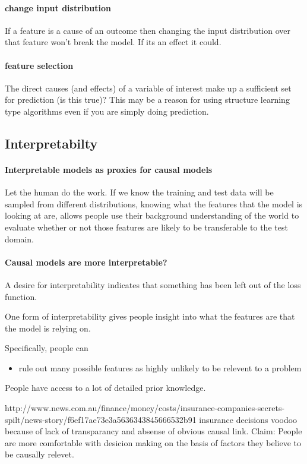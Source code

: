 \documentclass[11pt,a4paper,oneside]{book}
\begin{document}
\paragraph{change input distribution}If a feature is a cause of an outcome then changing the input distribution over that feature won't break the model. If its an effect it could.

\paragraph{feature selection} The direct causes (and effects) of a variable of interest make up a sufficient set for prediction (is this true)? This may be a reason for using structure learning type algorithms even if you are simply doing prediction.
\subsection*{Interpretabilty}
\paragraph*{Interpretable models as proxies for causal models} Let the human do the work. If we know the training and test data will be sampled from different distributions, knowing what the features that the model is looking at are, allows people use their background understanding of the world to evaluate whether or not those features are likely to be transferable to the test domain. 

\paragraph*{Causal models are more interpretable?}

A desire for interpretability indicates that something has been left out of the loss function. 

One form of interpretability gives people insight into what the features are that the model is relying on.

Specifically, people can
\begin{itemize}
\item rule out many possible features as highly unlikely to be relevent to a problem
\end{itemize}

People have access to a lot of detailed prior knowledge.  

http://www.news.com.au/finance/money/costs/insurance-companies-secrets-spilt/news-story/f6ef17ae73e3a5636343845666532b91 insurance decisions voodoo because of lack of transparancy and absense of obvious causal link. Claim: People are more comfortable with desicion making on the basis of factors they believe to be causally relevet.
\end{document}
